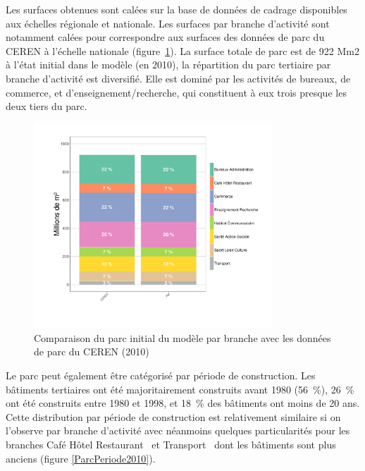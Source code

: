 \documentclass[10.5pt,a4paper]{article}
\begin{document}
{Les surfaces obtenues sont calées sur la base de données de cadrage disponibles aux échelles régionale et nationale. Les surfaces par branche d'activité sont notamment calées pour correspondre aux surfaces des données de parc du CEREN à l'échelle nationale (figure~\ref{CompParcCEREN2010}). La surface totale de parc est de 922 Mm2 à l’état initial dans le modèle (en 2010), la répartition du parc tertiaire par branche d’activité est diversifié. Elle est dominé par les activités de bureaux, de commerce, et d’enseignement/recherche, qui constituent à eux trois presque les deux tiers du parc.

\begin{figure}[ht]
\centering
\caption{Comparaison du parc initial du modèle par branche avec les données de parc du CEREN (2010)}\label{CompParcCEREN2010}
\includegraphics[width = 0.8\textwidth]{CompParcCEREN2010}
\end{figure}

Le parc peut également être catégorisé par période de construction. Les bâtiments tertiaires ont été majoritairement construits avant 1980 (56~\%),  26~\% ont été construits entre 1980 et 1998, et 18~\% des bâtiments ont moins de 20 ans. Cette distribution par période de construction est relativement similaire si on l'observe par branche d'activité avec néanmoins quelques particularités pour les branches \og Café Hôtel Restaurant \fg~et  \og Transport \fg~dont les bâtiments sont plus anciens (figure \ref{ParcPeriode2010}). 

}
\end{document}

